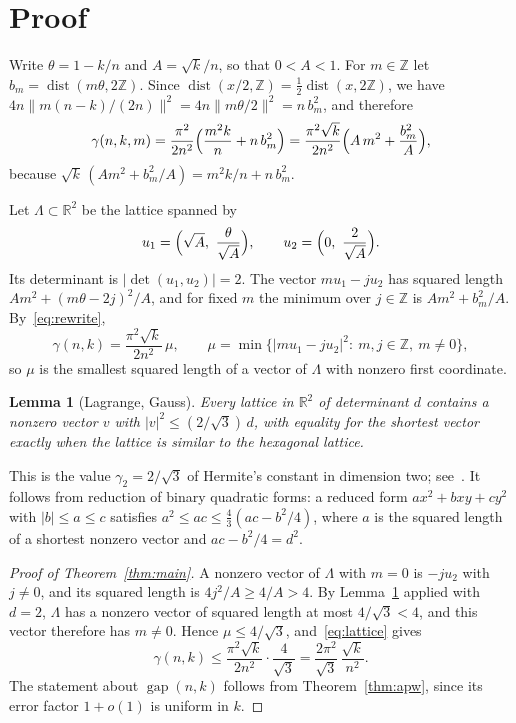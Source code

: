 \documentclass[11pt]{amsart}
\newtheorem{lemma}[theorem]{Lemma}
\theoremstyle{remark}
\newcommand{\gap}{\operatorname{gap}}
\begin{document}
\section{Proof}\label{sec:proof}

Write $\theta=1-k/n$ and $A=\sqrt k/n$, so that $0<A<1$. For $m\in\mathbb Z$ let
$b_m=\operatorname{dist}(m\theta,2\mathbb Z)$. Since $\operatorname{dist}(x/2,\mathbb Z)=\tfrac12\operatorname{dist}(x,2\mathbb Z)$,
we have $4n\|m(n-k)/(2n)\|^2=4n\|m\theta/2\|^2=n\,b_m^2$, and therefore
\begin{equation}\label{eq:rewrite}
\gamma(n,k,m)=\frac{\pi^2}{2n^2}\Bigl(\frac{m^2k}{n}+n\,b_m^2\Bigr)
=\frac{\pi^2\sqrt k}{2n^2}\Bigl(A\,m^2+\frac{b_m^2}{A}\Bigr),
\end{equation}
because $\sqrt k\,(Am^2+b_m^2/A)=m^2k/n+n\,b_m^2$.

Let $\Lambda\subset\mathbb R^2$ be the lattice spanned by
\[
u_1=\Bigl(\sqrt A,\ \frac{\theta}{\sqrt A}\Bigr),\qquad u_2=\Bigl(0,\ \frac{2}{\sqrt A}\Bigr).
\]
Its determinant is $|\det(u_1,u_2)|=2$. The vector $mu_1-ju_2$ has squared length
$Am^2+(m\theta-2j)^2/A$, and for fixed $m$ the minimum over $j\in\mathbb Z$ is $Am^2+b_m^2/A$. By~\eqref{eq:rewrite},
\begin{equation}\label{eq:lattice}
\gamma(n,k)=\frac{\pi^2\sqrt k}{2n^2}\,\mu,\qquad
\mu=\min\bigl\{|mu_1-ju_2|^2:\ m,j\in\mathbb Z,\ m\ne0\bigr\},
\end{equation}
so $\mu$ is the smallest squared length of a vector of $\Lambda$ with nonzero first coordinate.

\begin{lemma}[Lagrange, Gauss]\label{lem:hermite}
Every lattice in $\mathbb R^2$ of determinant $d$ contains a nonzero vector $v$ with $|v|^2\le(2/\sqrt3)\,d$, with
equality for the shortest vector exactly when the lattice is similar to the hexagonal lattice.
\end{lemma}

This is the value $\gamma_2=2/\sqrt3$ of Hermite's constant in dimension two; see~\cite[Chapter~II]{Cas59}. It follows
from reduction of binary quadratic forms: a reduced form $ax^2+bxy+cy^2$ with $|b|\le a\le c$ satisfies
$a^2\le ac\le\frac43(ac-b^2/4)$, where $a$ is the squared length of a shortest nonzero vector and $ac-b^2/4=d^2$.

\begin{proof}[Proof of Theorem~\ref{thm:main}]
A nonzero vector of $\Lambda$ with $m=0$ is $-ju_2$ with $j\ne0$, and its squared length is $4j^2/A\ge4/A>4$. By
Lemma~\ref{lem:hermite} applied with $d=2$, $\Lambda$ has a nonzero vector of squared length at most $4/\sqrt3<4$, and
this vector therefore has $m\ne0$. Hence $\mu\le4/\sqrt3$, and~\eqref{eq:lattice} gives
\[
\gamma(n,k)\le\frac{\pi^2\sqrt k}{2n^2}\cdot\frac{4}{\sqrt3}=\frac{2\pi^2}{\sqrt3}\,\frac{\sqrt k}{n^2}.
\]
The statement about $\gap(n,k)$ follows from Theorem~\ref{thm:apw}, since its error factor $1+o(1)$ is uniform in $k$.
\end{proof}
\end{document}

